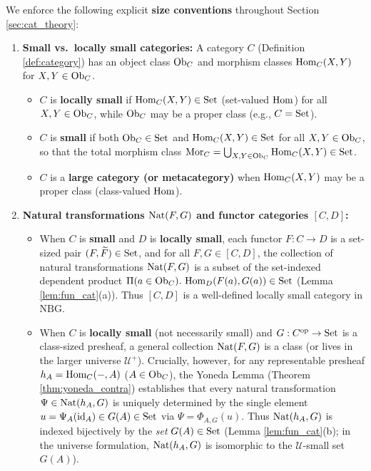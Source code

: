 \documentclass[10pt,a4paper]{article}
\begin{document}
We enforce the following explicit \textbf{size conventions} throughout Section \ref{sec:cat_theory}:
\begin{enumerate}
\item \textbf{Small vs.\ locally small categories:} A category $C$ (Definition \ref{def:category}) has an object class ${\textrm{Ob}}_C$ and morphism classes ${\textrm{Hom}}_C(X, Y)$ for $X, Y \in {\textrm{Ob}}_C$.
  \begin{itemize}
  \item $C$ is \textbf{locally small} if ${\textrm{Hom}}_C(X, Y) \in {\textrm{Set}}$ (set-valued ${\textrm{Hom}}$) for all $X, Y \in {\textrm{Ob}}_C$, while ${\textrm{Ob}}_C$ may be a proper class (e.g., $C = {\textrm{Set}}$).
  \item $C$ is \textbf{small} if both ${\textrm{Ob}}_C \in {\textrm{Set}}$ and ${\textrm{Hom}}_C(X, Y) \in {\textrm{Set}}$ for all $X, Y \in {\textrm{Ob}}_C$, so that the total morphism class ${\textrm{Mor}}_C = \bigcup_{X,Y \in {\textrm{Ob}}_C} {\textrm{Hom}}_C(X, Y) \in {\textrm{Set}}$.
  \item $C$ is a \textbf{large category (or metacategory)} when ${\textrm{Hom}}_C(X, Y)$ may be a proper class (class-valued ${\textrm{Hom}}$).
  \end{itemize}
\item \textbf{Natural transformations ${\textrm{Nat}}(F, G)$ and functor categories $[C, D]$:}
  \begin{itemize}
  \item When $C$ is \textbf{small} and $D$ is \textbf{locally small}, each functor $F : C \to D$ is a set-sized pair $(F, {\widetilde{F}\textrm{}}) \in {\textrm{Set}}$, and for all $F, G \in [C, D]$, the collection of natural transformations ${\textrm{Nat}}(F, G)$ is a subset of the set-indexed dependent product $\Pi(a \in \Ob_C).\ \Hom_D(F(a), G(a)) \in \Set$ (Lemma \ref{lem:fun_cat}(a)). Thus $[C, D]$ is a well-defined locally small category in $\mathrm{NBG}$.
  \item When $C$ is \textbf{locally small} (not necessarily small) and $G : C^{\textrm{op}} \to {\textrm{Set}}$ is a class-sized presheaf, a general collection ${\textrm{Nat}}(F, G)$ is a class (or lives in the larger universe $\mathcal{U}^+$). Crucially, however, for any representable presheaf $h_A = {\textrm{Hom}}_C(-, A)$ ($A \in {\textrm{Ob}}_C$), the Yoneda Lemma (Theorem \ref{thm:yoneda_contra}) establishes that every natural transformation $\Psi \in {\textrm{Nat}}(h_A, G)$ is uniquely determined by the single element $u = \Psi_A({\textrm{id}}_A) \in G(A) \in {\textrm{Set}}$ via $\Psi = \Phi_{A,G}(u)$. Thus ${\textrm{Nat}}(h_A, G)$ is indexed bijectively by the \emph{set} $G(A) \in {\textrm{Set}}$ (Lemma \ref{lem:fun_cat}(b); in the universe formulation, ${\textrm{Nat}}(h_A, G)$ is isomorphic to the $\mathcal{U}$-small set $G(A)$).
  \end{itemize}

\end{enumerate}
\end{document}

